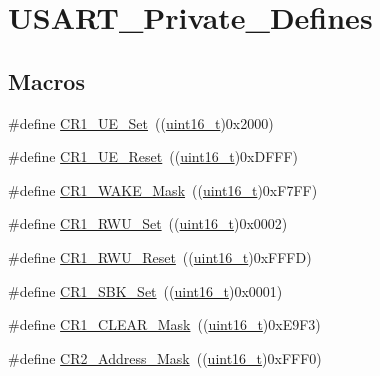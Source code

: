 \hypertarget{group___u_s_a_r_t___private___defines}{}\section{U\+S\+A\+R\+T\+\_\+\+Private\+\_\+\+Defines}
\label{group___u_s_a_r_t___private___defines}
\subsection*{Macros}
\begin{DoxyCompactItemize}
\item 
\#define \hyperlink{group___u_s_a_r_t___private___defines_ga95f5821be56b1a5dbfdd38fdb37ed54c}{C\+R1\+\_\+\+U\+E\+\_\+\+Set}~((\hyperlink{_p_e___types_8h_a1f1825b69244eb3ad2c7165ddc99c956}{uint16\+\_\+t})0x2000)
\item 
\#define \hyperlink{group___u_s_a_r_t___private___defines_ga9c75a44192cb3dbbbf509cddfc47481c}{C\+R1\+\_\+\+U\+E\+\_\+\+Reset}~((\hyperlink{_p_e___types_8h_a1f1825b69244eb3ad2c7165ddc99c956}{uint16\+\_\+t})0x\+D\+F\+F\+F)
\item 
\#define \hyperlink{group___u_s_a_r_t___private___defines_gae4045dea092c3cbfe07d14fef39195ce}{C\+R1\+\_\+\+W\+A\+K\+E\+\_\+\+Mask}~((\hyperlink{_p_e___types_8h_a1f1825b69244eb3ad2c7165ddc99c956}{uint16\+\_\+t})0x\+F7\+F\+F)
\item 
\#define \hyperlink{group___u_s_a_r_t___private___defines_ga5cb566b7c5e126e5ef11dd25bba50ffa}{C\+R1\+\_\+\+R\+W\+U\+\_\+\+Set}~((\hyperlink{_p_e___types_8h_a1f1825b69244eb3ad2c7165ddc99c956}{uint16\+\_\+t})0x0002)
\item 
\#define \hyperlink{group___u_s_a_r_t___private___defines_ga064a46d19ffffddd410e969798d335ee}{C\+R1\+\_\+\+R\+W\+U\+\_\+\+Reset}~((\hyperlink{_p_e___types_8h_a1f1825b69244eb3ad2c7165ddc99c956}{uint16\+\_\+t})0x\+F\+F\+F\+D)
\item 
\#define \hyperlink{group___u_s_a_r_t___private___defines_ga2813b7fa1263aecfeefa48f8a55938b9}{C\+R1\+\_\+\+S\+B\+K\+\_\+\+Set}~((\hyperlink{_p_e___types_8h_a1f1825b69244eb3ad2c7165ddc99c956}{uint16\+\_\+t})0x0001)
\item 
\#define \hyperlink{group___u_s_a_r_t___private___defines_ga67f7dd35ea3d1296677e5fc50b88fa90}{C\+R1\+\_\+\+C\+L\+E\+A\+R\+\_\+\+Mask}~((\hyperlink{_p_e___types_8h_a1f1825b69244eb3ad2c7165ddc99c956}{uint16\+\_\+t})0x\+E9\+F3)
\item 
\#define \hyperlink{group___u_s_a_r_t___private___defines_ga080c343a5a95d4419789b94405c27764}{C\+R2\+\_\+\+Address\+\_\+\+Mask}~((\hyperlink{_p_e___types_8h_a1f1825b69244eb3ad2c7165ddc99c956}{uint16\+\_\+t})0x\+F\+F\+F0)

\end{DoxyCompactItemize}
